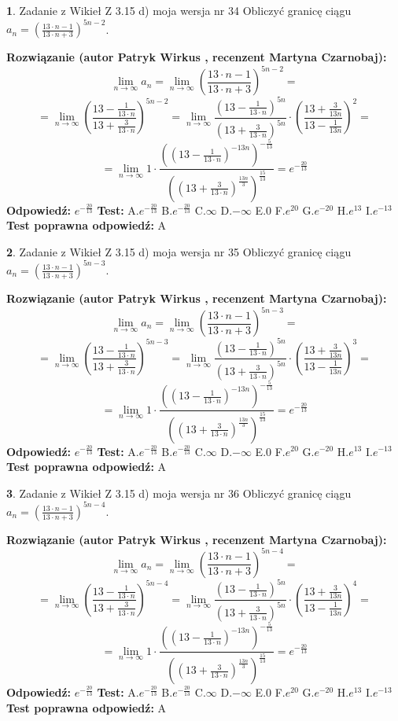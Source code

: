 \documentclass[12pt, a4paper]{article}
\theoremstyle{definition} %
\newtheorem{zad}{}
\newcommand{\zadStart}[1]{\begin{zad}#1\newline}
\newcommand{\zadStop}{\end{zad}}
\newcommand{\rozwStart}[2]{\noindent \textbf{Rozwiązanie (autor #1 , recenzent #2): }\newline}
\newcommand{\rozwStop}{\newline}
\newcommand{\odpStart}{\noindent \textbf{Odpowiedź:}\newline}
\newcommand{\odpStop}{\newline}
\newcommand{\testStart}{\noindent \textbf{Test:}\newline}
\newcommand{\testStop}{\newline}
\newcommand{\kluczStart}{\noindent \textbf{Test poprawna odpowiedź:}\newline}
\newcommand{\kluczStop}{\newline}
\begin{document}
\zadStart{Zadanie z Wikieł Z 3.15 d) moja wersja nr 34}
Obliczyć granicę ciągu $a_{n}=(\frac{13\cdot n - 1}{13 \cdot n + 3})^{5n-2}$.
\zadStop
\rozwStart{Patryk Wirkus}{Martyna Czarnobaj}
$$\lim\limits_{n\to\infty} a_{n} = \lim\limits_{n\to\infty}(\frac{13\cdot n - 1}{13 \cdot n + 3})^{5n-2}=$$
$$=\lim\limits_{n\to\infty}(\frac{13 - \frac{1}{13\cdot n}}{13 + \frac{3}{13 \cdot n}})^{5n-2}=\lim\limits_{n\to\infty}\frac{(13 - \frac{1}{13\cdot n})^{5n}}{(13 + \frac{3}{13\cdot n})^{5n}} \cdot (\frac{13+\frac{3}{13n}}{13-\frac{1}{13n}})^{2}=$$
$$=\lim\limits_{n\to\infty} 1 \cdot \frac{((13-\frac{1}{13 \cdot n})^{-13n})^{-\frac{5}{13}}}{((13+\frac{3}{13 \cdot n})^{\frac{13n}{3}})^{\frac{15}{13}}} =e^{-\frac{20}{13}}$$
\rozwStop
\odpStart
$e^{-\frac{20}{13}}$
\odpStop
\testStart
A.$ e^{-\frac{20}{13}}$
B.$ e^{-\frac{20}{13}}$
C.$\infty$
D.$-\infty$
E.$0$
F.$e^{20}$
G.$e^{-20}$
H.$e^{13}$
I.$e^{-13}$
\testStop
\kluczStart
A
\kluczStop



\zadStart{Zadanie z Wikieł Z 3.15 d) moja wersja nr 35}
Obliczyć granicę ciągu $a_{n}=(\frac{13\cdot n - 1}{13 \cdot n + 3})^{5n-3}$.
\zadStop
\rozwStart{Patryk Wirkus}{Martyna Czarnobaj}
$$\lim\limits_{n\to\infty} a_{n} = \lim\limits_{n\to\infty}(\frac{13\cdot n - 1}{13 \cdot n + 3})^{5n-3}=$$
$$=\lim\limits_{n\to\infty}(\frac{13 - \frac{1}{13\cdot n}}{13 + \frac{3}{13 \cdot n}})^{5n-3}=\lim\limits_{n\to\infty}\frac{(13 - \frac{1}{13\cdot n})^{5n}}{(13 + \frac{3}{13\cdot n})^{5n}} \cdot (\frac{13+\frac{3}{13n}}{13-\frac{1}{13n}})^{3}=$$
$$=\lim\limits_{n\to\infty} 1 \cdot \frac{((13-\frac{1}{13 \cdot n})^{-13n})^{-\frac{5}{13}}}{((13+\frac{3}{13 \cdot n})^{\frac{13n}{3}})^{\frac{15}{13}}} =e^{-\frac{20}{13}}$$
\rozwStop
\odpStart
$e^{-\frac{20}{13}}$
\odpStop
\testStart
A.$ e^{-\frac{20}{13}}$
B.$ e^{-\frac{20}{13}}$
C.$\infty$
D.$-\infty$
E.$0$
F.$e^{20}$
G.$e^{-20}$
H.$e^{13}$
I.$e^{-13}$
\testStop
\kluczStart
A
\kluczStop



\zadStart{Zadanie z Wikieł Z 3.15 d) moja wersja nr 36}
Obliczyć granicę ciągu $a_{n}=(\frac{13\cdot n - 1}{13 \cdot n + 3})^{5n-4}$.
\zadStop
\rozwStart{Patryk Wirkus}{Martyna Czarnobaj}
$$\lim\limits_{n\to\infty} a_{n} = \lim\limits_{n\to\infty}(\frac{13\cdot n - 1}{13 \cdot n + 3})^{5n-4}=$$
$$=\lim\limits_{n\to\infty}(\frac{13 - \frac{1}{13\cdot n}}{13 + \frac{3}{13 \cdot n}})^{5n-4}=\lim\limits_{n\to\infty}\frac{(13 - \frac{1}{13\cdot n})^{5n}}{(13 + \frac{3}{13\cdot n})^{5n}} \cdot (\frac{13+\frac{3}{13n}}{13-\frac{1}{13n}})^{4}=$$
$$=\lim\limits_{n\to\infty} 1 \cdot \frac{((13-\frac{1}{13 \cdot n})^{-13n})^{-\frac{5}{13}}}{((13+\frac{3}{13 \cdot n})^{\frac{13n}{3}})^{\frac{15}{13}}} =e^{-\frac{20}{13}}$$
\rozwStop
\odpStart
$e^{-\frac{20}{13}}$
\odpStop
\testStart
A.$ e^{-\frac{20}{13}}$
B.$ e^{-\frac{20}{13}}$
C.$\infty$
D.$-\infty$
E.$0$
F.$e^{20}$
G.$e^{-20}$
H.$e^{13}$
I.$e^{-13}$
\testStop
\kluczStart
A
\kluczStop
\end{document}
